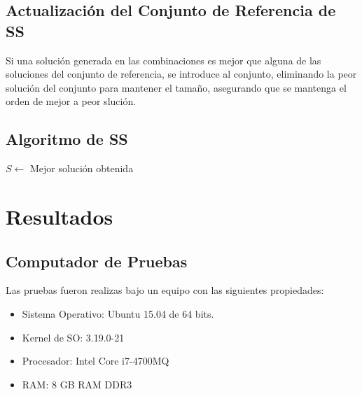 \documentclass{ci5652}
\begin{document}
\subsection{Actualización del Conjunto de Referencia de SS}
Si una solución generada en las combinaciones es mejor que alguna de las soluciones del conjunto de referencia, se introduce al conjunto, eliminando la peor solución del conjunto para mantener el tamaño, asegurando que se mantenga el orden de mejor a peor slución.

\subsection{Algoritmo de SS}

\begin{algorithm}[h!]
\DontPrintSemicolon
$S \leftarrow$ Mejor solución obtenida\;
\end{algorithm}

\section{Resultados}

\subsection{Computador de Pruebas}
Las pruebas fueron realizas bajo un equipo con las siguientes propiedades:
\begin{itemize} \itemsep0pt
	\item Sistema Operativo: Ubuntu 15.04 de 64 bits.
	\item Kernel de SO: 3.19.0-21
	\item Procesador: Intel Core i7-4700MQ
	\item RAM: 8 GB RAM DDR3
\end{itemize}
\end{document}
